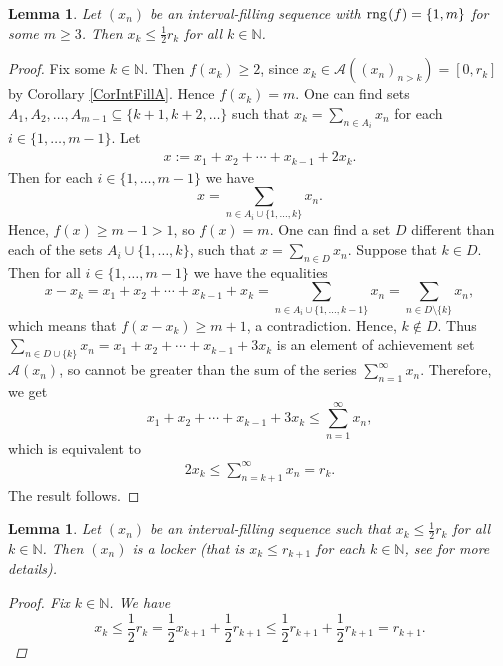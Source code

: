 \documentclass{amsart}
\newtheorem{lemma}[theorem]{Lemma}
\theoremstyle{definition}
\newcommand{\rng}{{\rm rng} \hspace{0.03cm}}
\begin{document}
\begin{lemma}\label{pologona}
Let $(x_n)$ be an interval-filling sequence with $\rng(f)=\{1,m\}$ for some $m\geq 3$. Then $x_k\leq\frac{1}{2}r_k$ for all $k\in\mathbb{N}$.
\end{lemma}
\begin{proof}
Fix some $k\in\mathbb{N}$. Then $f(x_k)\geq 2$, since $x_k\in \mathcal{A}((x_n)_{n>k})=[0,r_k]$ by Corollary \ref{CorIntFillA}. Hence $f(x_k)=m$. One can find sets $A_1,A_2,\ldots,A_{m-1}\subseteq \{k+1,k+2,\ldots\}$ such that $x_k=\sum_{n\in A_i}x_n$ for each $i\in\{1,\ldots,m-1\}$. Let
\begin{align*}
x:=x_1+x_2+\cdots+x_{k-1}+2x_k.
\end{align*}
Then for each $i\in\{1,\ldots ,m-1\}$ we have
$$x=\sum_{n\in A_i\cup\{1,\ldots,k\}}x_n.$$
Hence, $f(x)\geq m-1>1$, so $f(x)=m$. One can find a set $D$ different than each of the sets $ A_i\cup\{1,\ldots,k\}$, such that $x=\sum_{n\in D}x_n$. Suppose that $k\in D$. Then for all $i\in\{1,\ldots,m-1\}$ we have the equalities
$$x-x_k=x_1+x_2+\cdots+x_{k-1}+x_k=\sum_{n\in A_i\cup\{1,\ldots,k-1\}}x_n=\sum_{n\in D\setminus\{k\}}x_n,$$
which means that $f(x-x_k)\geq m+1$, a contradiction. Hence, $k\notin D$. Thus $\sum_{n\in D\cup\{k\}}x_n= x_1+x_2+\cdots+x_{k-1}+3x_k$ is an element of achievement set $\mathcal{A}(x_n)$, so cannot be greater than the sum of the series $\sum_{n=1}^{\infty}x_n$. Therefore, we get
$$x_1+x_2+\cdots+x_{k-1}+3x_k\leq \sum_{n=1}^{\infty}x_n,$$
which is equivalent to 
\begin{align*}
2x_{k}\leq \sum_{n=k+1}^{\infty}x_{n}=r_{k}.
\end{align*}
The result follows.
\end{proof}


\begin{lemma}\label{zwiazekzlockerem}
Let $(x_n)$ be an interval-filling sequence such that $x_k\leq\frac{1}{2}r_k$ for all $k\in\mathbb{N}$. Then $(x_n)$ is a locker (that is $x_k\leq r_{k+1}$ for each $k\in\mathbb{N}$, see \cite{DJK} for more details). 
\begin{proof}
Fix $k\in\mathbb{N}$. We have
$$x_k\leq \frac{1}{2}r_k=\frac{1}{2}x_{k+1}+\frac{1}{2}r_{k+1}\leq \frac{1}{2}r_{k+1}+\frac{1}{2}r_{k+1}=r_{k+1}.$$
\end{proof}
\end{lemma}
\end{document}
